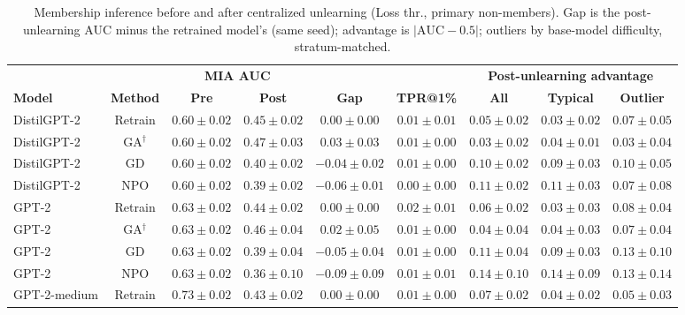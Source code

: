 \begin{table}[t]
\centering
\caption{Membership inference before and after centralized unlearning (Loss thr., primary non-members). Gap is the post-unlearning AUC minus the retrained model's (same seed); advantage is $|\mathrm{AUC}-0.5|$; outliers by base-model difficulty, stratum-matched.}
\label{tab:central-loss-threshold-primary}
\footnotesize
\renewcommand{\arraystretch}{1.2}
\setlength{\tabcolsep}{3pt}
\begin{tabular*}{\textwidth}{@{\extracolsep{\fill}}lcccccccc@{}}
\toprule
 & & \multicolumn{2}{c}{\textbf{MIA AUC}} & & & \multicolumn{3}{c}{\textbf{Post-unlearning advantage}} \\
\cmidrule(lr){3-4}\cmidrule(lr){7-9}
\textbf{Model} & \textbf{Method} & \textbf{Pre} & \textbf{Post} & \textbf{Gap} & \textbf{TPR@1\%} & \textbf{All} & \textbf{Typical} & \textbf{Outlier} \\
\midrule
DistilGPT-2 & Retrain & $0.60 \pm 0.02$ & $0.45 \pm 0.02$ & $0.00 \pm 0.00$ & $0.01 \pm 0.01$ & $0.05 \pm 0.02$ & $0.03 \pm 0.02$ & $0.07 \pm 0.05$ \\
DistilGPT-2 & GA$^{\dagger}$ & $0.60 \pm 0.02$ & $0.47 \pm 0.03$ & $0.03 \pm 0.03$ & $0.01 \pm 0.00$ & $0.03 \pm 0.02$ & $0.04 \pm 0.01$ & $0.03 \pm 0.04$ \\
DistilGPT-2 & GD & $0.60 \pm 0.02$ & $0.40 \pm 0.02$ & $-0.04 \pm 0.02$ & $0.01 \pm 0.00$ & $0.10 \pm 0.02$ & $0.09 \pm 0.03$ & $0.10 \pm 0.05$ \\
DistilGPT-2 & NPO & $0.60 \pm 0.02$ & $0.39 \pm 0.02$ & $-0.06 \pm 0.01$ & $0.00 \pm 0.00$ & $0.11 \pm 0.02$ & $0.11 \pm 0.03$ & $0.07 \pm 0.08$ \\
GPT-2 & Retrain & $0.63 \pm 0.02$ & $0.44 \pm 0.02$ & $0.00 \pm 0.00$ & $0.02 \pm 0.01$ & $0.06 \pm 0.02$ & $0.03 \pm 0.03$ & $0.08 \pm 0.04$ \\
GPT-2 & GA$^{\dagger}$ & $0.63 \pm 0.02$ & $0.46 \pm 0.04$ & $0.02 \pm 0.05$ & $0.01 \pm 0.00$ & $0.04 \pm 0.04$ & $0.04 \pm 0.03$ & $0.07 \pm 0.04$ \\
GPT-2 & GD & $0.63 \pm 0.02$ & $0.39 \pm 0.04$ & $-0.05 \pm 0.04$ & $0.01 \pm 0.00$ & $0.11 \pm 0.04$ & $0.09 \pm 0.03$ & $0.13 \pm 0.10$ \\
GPT-2 & NPO & $0.63 \pm 0.02$ & $0.36 \pm 0.10$ & $-0.09 \pm 0.09$ & $0.01 \pm 0.01$ & $0.14 \pm 0.10$ & $0.14 \pm 0.09$ & $0.13 \pm 0.14$ \\
GPT-2-medium & Retrain & $0.73 \pm 0.02$ & $0.43 \pm 0.02$ & $0.00 \pm 0.00$ & $0.01 \pm 0.00$ & $0.07 \pm 0.02$ & $0.04 \pm 0.02$ & $0.05 \pm 0.03$ \\

\end{tabular*}
\end{table}
